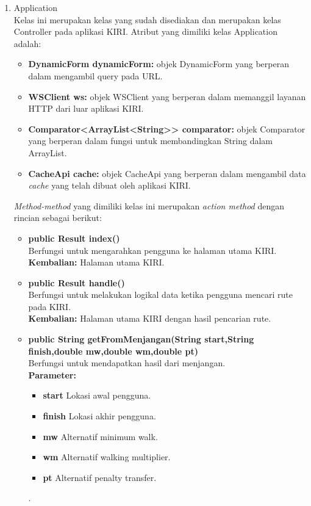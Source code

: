 \begin{enumerate}
	\item Application\\
	Kelas ini merupakan kelas yang sudah disediakan \play dan merupakan kelas Controller pada aplikasi KIRI. Atribut yang dimiliki kelas Application adalah:
	\begin{itemize}
		\item \textbf{DynamicForm dynamicForm:} objek DynamicForm yang berperan dalam mengambil query pada URL. 
		\item \textbf{WSClient ws:} objek WSClient yang berperan dalam memanggil layanan HTTP dari luar aplikasi KIRI.
		\item \textbf{Comparator<ArrayList<String>> comparator:} objek Comparator yang berperan dalam fungsi untuk membandingkan String dalam ArrayList.
		\item \textbf{CacheApi cache:} objek CacheApi yang berperan dalam mengambil data \textit{cache} yang telah dibuat oleh aplikasi KIRI.
		
	\end{itemize}
	\textit{Method-method} yang dimiliki kelas ini merupakan \textit{action method} dengan rincian sebagai berikut:
	\begin{itemize}
		\item \textbf{public Result index()}\\
		Berfungsi untuk mengarahkan pengguna ke halaman utama KIRI.\\
		\textbf{Kembalian:}  Halaman utama KIRI.
		
		\item \textbf{public Result handle()}\\
		Berfungsi untuk melakukan logikal data ketika pengguna mencari rute pada KIRI.\\
		\textbf{Kembalian:}  Halaman utama KIRI dengan hasil pencarian rute.
		
		\item \textbf{public String getFromMenjangan(String start,String finish,double mw,double wm,double pt)}\\
		Berfungsi untuk mendapatkan hasil dari menjangan.\\
		\textbf{Parameter:}
				\begin{itemize}
					\item \textbf{start} Lokasi awal pengguna.
					\item \textbf{finish} Lokasi akhir pengguna.
					\item \textbf{mw} Alternatif minimum walk.
					\item \textbf{wm} Alternatif walking multiplier.
					\item \textbf{pt} Alternatif penalty transfer.
				\end{itemize}.
				

\end{itemize}
\end{enumerate}
